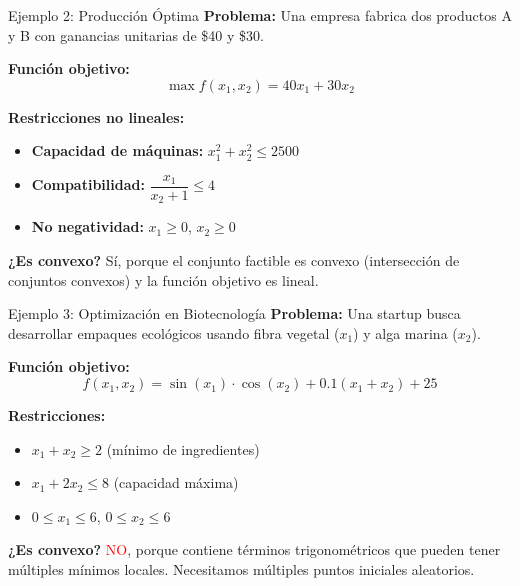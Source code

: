 \documentclass{beamer}
\begin{document}
\begin{frame}{Ejemplo 2: Producción Óptima}
    \textbf{Problema:} Una empresa fabrica dos productos A y B con ganancias unitarias de \$40 y \$30.
    
    \vspace{0.3cm}
    
    \textbf{Función objetivo:}
    \[\max f(x_1, x_2) = 40x_1 + 30x_2\]
    
    \textbf{Restricciones no lineales:}
    \begin{itemize}
        \item \textbf{Capacidad de máquinas:} $x_1^2 + x_2^2 \leq 2500$
        \item \textbf{Compatibilidad:} $\dfrac{x_1}{x_2 + 1} \leq 4$
        \item \textbf{No negatividad:} $x_1 \geq 0$, $x_2 \geq 0$
    \end{itemize}
    
    \vspace{0.3cm}
    
    \textbf{¿Es convexo?} Sí, porque el conjunto factible es convexo (intersección de conjuntos convexos) y la función objetivo es lineal.
\end{frame}

\begin{frame}{Ejemplo 3: Optimización en Biotecnología}
    \textbf{Problema:} Una startup busca desarrollar empaques ecológicos usando fibra vegetal ($x_1$) y alga marina ($x_2$).
    
    \vspace{0.3cm}
    
    \textbf{Función objetivo:}
    \[f(x_1, x_2) = \sin(x_1) \cdot \cos(x_2) + 0.1(x_1 + x_2) + 25\]
    
    \textbf{Restricciones:}
    \begin{itemize}
        \item $x_1 + x_2 \geq 2$ (mínimo de ingredientes)
        \item $x_1 + 2x_2 \leq 8$ (capacidad máxima)
        \item $0 \leq x_1 \leq 6$, $0 \leq x_2 \leq 6$
    \end{itemize}
    
    \vspace{0.3cm}
    
    \textbf{¿Es convexo?} \textcolor{red}{NO}, porque contiene términos trigonométricos que pueden tener múltiples mínimos locales. Necesitamos múltiples puntos iniciales aleatorios.
\end{frame}
\end{document}
